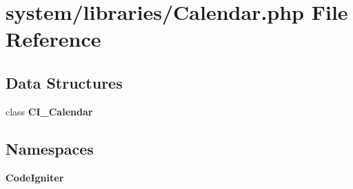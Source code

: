 \section{system/libraries/\-Calendar.php File Reference}
\label{_calendar_8php}
\subsection*{Data Structures}
\begin{DoxyCompactItemize}
\item 
class {\bf C\-I\-\_\-\-Calendar}
\end{DoxyCompactItemize}
\subsection*{Namespaces}
\begin{DoxyCompactItemize}
\item 
{\bf Code\-Igniter}
\end{DoxyCompactItemize}
